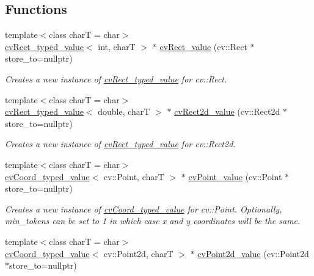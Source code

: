 \subsection*{Functions}
\begin{DoxyCompactItemize}
\item 
{\footnotesize template$<$class charT  = char$>$ }\\\hyperlink{structboost_1_1program__options_1_1cv_rect__typed__value}{cv\+Rect\+\_\+typed\+\_\+value}$<$ int, charT $>$ $\ast$ \hyperlink{group___imagery_module_ga4c86fa93534ee8f020d46b81f7513c8a}{cv\+Rect\+\_\+value} (cv\+::\+Rect $\ast$store\+\_\+to=nullptr)
\begin{DoxyCompactList}\small\item\em Creates a new instance of \hyperlink{structboost_1_1program__options_1_1cv_rect__typed__value}{cv\+Rect\+\_\+typed\+\_\+value} for cv\+::\+Rect. \end{DoxyCompactList}\item 
{\footnotesize template$<$class charT  = char$>$ }\\\hyperlink{structboost_1_1program__options_1_1cv_rect__typed__value}{cv\+Rect\+\_\+typed\+\_\+value}$<$ double, charT $>$ $\ast$ \hyperlink{group___imagery_module_gaa8c37992162927f9717159d47accbc97}{cv\+Rect2d\+\_\+value} (cv\+::\+Rect2d $\ast$store\+\_\+to=nullptr)
\begin{DoxyCompactList}\small\item\em Creates a new instance of \hyperlink{structboost_1_1program__options_1_1cv_rect__typed__value}{cv\+Rect\+\_\+typed\+\_\+value} for cv\+::\+Rect2d. \end{DoxyCompactList}\item 
{\footnotesize template$<$class charT  = char$>$ }\\\hyperlink{structboost_1_1program__options_1_1cv_coord__typed__value}{cv\+Coord\+\_\+typed\+\_\+value}$<$ cv\+::\+Point, charT $>$ $\ast$ \hyperlink{group___imagery_module_ga9a85fe711b2ade00ca9bb9288d405d98}{cv\+Point\+\_\+value} (cv\+::\+Point $\ast$store\+\_\+to=nullptr)
\begin{DoxyCompactList}\small\item\em Creates a new instance of \hyperlink{structboost_1_1program__options_1_1cv_coord__typed__value}{cv\+Coord\+\_\+typed\+\_\+value} for cv\+::\+Point. Optionally, min\+\_\+tokens can be set to 1 in which case x and y coordinates will be the same. \end{DoxyCompactList}\item 
{\footnotesize template$<$class charT  = char$>$ }\\\hyperlink{structboost_1_1program__options_1_1cv_coord__typed__value}{cv\+Coord\+\_\+typed\+\_\+value}$<$ cv\+::\+Point2d, charT $>$ $\ast$ \hyperlink{group___imagery_module_ga18ab1a2491f19ae825e658aee9ff5f4e}{cv\+Point2d\+\_\+value} (cv\+::\+Point2d $\ast$store\+\_\+to=nullptr)

\end{DoxyCompactItemize}
